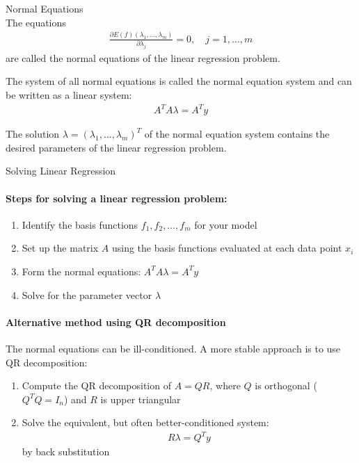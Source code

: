 \begin{definition}{Normal Equations}\\
The equations
\begin{align*}
\frac{\partial E(f)(\lambda_1,\ldots,\lambda_m)}{\partial \lambda_j} = 0, \quad j=1,\ldots,m
\end{align*}
are called the normal equations of the linear regression problem.

The system of all normal equations is called the normal equation system and can be written as a linear system:
\begin{align*}
A^T A\lambda = A^T y
\end{align*}

The solution $\lambda = (\lambda_1,\ldots,\lambda_m)^T$ of the normal equation system contains the desired parameters of the linear regression problem.
\end{definition}

\begin{KR}{Solving Linear Regression}\\
\paragraph{Steps for solving a linear regression problem:}
\begin{enumerate}
    \item Identify the basis functions $f_1, f_2, \ldots, f_m$ for your model
    \item Set up the matrix $A$ using the basis functions evaluated at each data point $x_i$
    \item Form the normal equations: $A^T A\lambda = A^T y$
    \item Solve for the parameter vector $\lambda$
\end{enumerate}

\paragraph{Alternative method using QR decomposition}
The normal equations can be ill-conditioned. A more stable approach is to use QR decomposition:
\begin{enumerate}
    \item Compute the QR decomposition of $A = QR$, where $Q$ is orthogonal ($Q^T Q = I_n$) and $R$ is upper triangular
    \item Solve the equivalent, but often better-conditioned system:
    \begin{align*}
    R\lambda = Q^T y
    \end{align*}
    by back substitution
\end{enumerate}
\end{KR}


